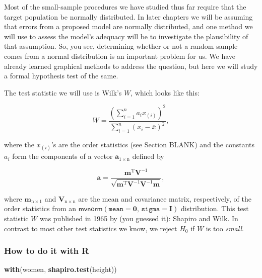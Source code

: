 \documentclass[]{book}
\newenvironment{Shaded}{\begin{snugshade}}{\end{snugshade}}
\newcommand{\KeywordTok}[1]{\textcolor[rgb]{0.13,0.29,0.53}{\textbf{{#1}}}}
\newcommand{\NormalTok}[1]{{#1}}
\numberwithin{equation}{chapter}
\numberwithin{figure}{chapter}
\theoremstyle{plain}
\theoremstyle{definition}
\theoremstyle{remark}
\theoremstyle{definition}
\theoremstyle{definition}
\theoremstyle{remark}
\begin{document}
Most of the small-sample procedures we have studied thus far require
that the target population be normally distributed. In later chapters we
will be assuming that errors from a proposed model are normally
distributed, and one method we will use to assess the model's adequacy
will be to investigate the plausibility of that assumption. So, you see,
determining whether or not a random sample comes from a normal
distribution is an important problem for us. We have already learned
graphical methods to address the question, but here we will study a
formal hypothesis test of the same.

The test statistic we will use is Wilk's \(W\), which looks like this:

\begin{equation}
W = \frac{\left(\sum_{i = 1}^{n} a_{i}x_{(i)} \right)^{2}}{\sum_{i = 1}^{n}(x_{i} - \overline{x})^{2}},
\end{equation}

where the \(x_{(i)}\)'s are the order statistics (see Section BLANK) and
the constants \(a_{i}\) form the components of a vector
\(\mathbf{a}_{1\times\mathrm{n}}\) defined by

\begin{equation}
\mathbf{a}=\frac{\mathbf{m}^{\mathrm{T}}\mathbf{V}^{-1}}{\sqrt{\mathbf{m}^{\mathrm{T}}\mathbf{V}^{-1}\mathbf{V}^{-1}\mathbf{m}}},
\end{equation}

where \(\mathbf{m}_{\mathrm{n}\times1}\) and
\(\mathbf{V}_{\mathrm{n} \times \mathrm{n}}\) are the mean and
covariance matrix, respectively, of the order statistics from an
\(\mathsf{mvnorm} \left(\mathtt{mean} = \mathbf{0},\,\mathtt{sigma} = \mathbf{I}\right)\)
distribution. This test statistic \(W\) was published in 1965 by (you
guessed it): Shapiro and Wilk\cite{Wilk1965}. In contrast to most other
test statistics we know, we reject \(H_{0}\) if \(W\) is too
\emph{small}.

\subsubsection{How to do it with R}\label{how-to-do-it-with-r-44}

\begin{Shaded}
\begin{Highlighting}[]
\KeywordTok{with}\NormalTok{(women, }\KeywordTok{shapiro.test}\NormalTok{(height))}
\end{Highlighting}
\end{Shaded}
\end{document}
